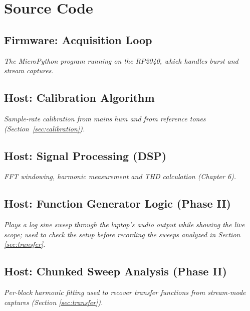 \documentclass[11pt, a4paper]{report}
\begin{document}
\appendix

\chapter{Source Code}

\section{Firmware: Acquisition Loop}
\textit{The MicroPython program running on the RP2040, which handles burst and stream captures.}


\section{Host: Calibration Algorithm}
\textit{Sample-rate calibration from mains hum and from reference tones (Section~\ref{sec:calibration}).}


\section{Host: Signal Processing (DSP)}
\textit{FFT windowing, harmonic measurement and THD calculation (Chapter 6).}


\section{Host: Function Generator Logic (Phase II)}
\textit{Plays a log sine sweep through the laptop's audio output while showing the live scope; used to check the setup before recording the sweeps analyzed in Section \ref{sec:transfer}.}


\section{Host: Chunked Sweep Analysis (Phase II)}
\label{app:chunked}
\textit{Per-block harmonic fitting used to recover transfer functions from stream-mode captures (Section \ref{sec:transfer}).}


\printbibliography[heading=bibintoc,title={References}]
\end{document}
